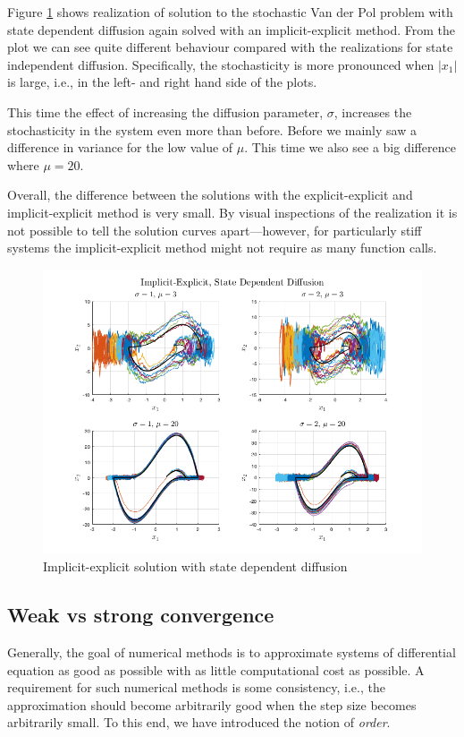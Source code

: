 Figure \ref{fig4:im_dep} shows realization of solution to the stochastic Van der Pol problem with state dependent diffusion again solved with an implicit-explicit method. From the plot we can see quite different behaviour compared with the realizations for state independent diffusion. Specifically, the stochasticity is more pronounced when $|x_1|$ is large, i.e., in the left- and right hand side of the plots.  

This time the effect of increasing the diffusion parameter, $\sigma$, increases the stochasticity in the system even more than before. Before we mainly saw a difference in variance for the low value of $\mu$. This time we also see a big difference where $\mu=20$.

Overall, the difference between the solutions with the explicit-explicit and implicit-explicit method is very small. By visual inspections of the realization it is not possible to tell the solution curves apart---however, for particularly stiff systems the implicit-explicit method might not require as many function calls. 


\begin{figure}[H]
    \centering
    \includegraphics[width=\textwidth]{graphics/opg4/im_dep.png}
    \caption{Implicit-explicit solution with state dependent diffusion}
    \label{fig4:im_dep}
\end{figure}


\subsection{Weak vs strong convergence}
Generally, the goal of numerical methods is to approximate systems of differential equation as good as possible with as little computational cost as possible. A requirement for such numerical methods is some consistency, i.e., the approximation should become arbitrarily good when the step size becomes arbitrarily small. To this end, we have introduced the notion of \textit{order}. 

